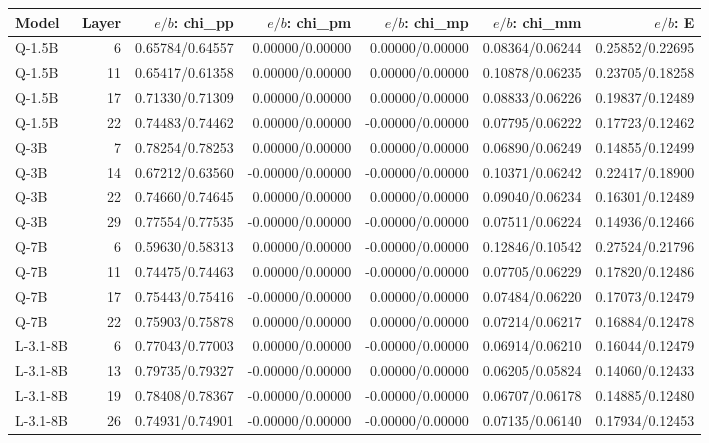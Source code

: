 \begin{tabular}{lrrrrrr}
\toprule
Model & Layer & $e/b$: chi\_pp & $e/b$: chi\_pm & $e/b$: chi\_mp & $e/b$: chi\_mm & $e/b$: E \\
\midrule
Q-1.5B & 6 & 0.65784/0.64557 & 0.00000/0.00000 & 0.00000/0.00000 & 0.08364/0.06244 & 0.25852/0.22695 \\
Q-1.5B & 11 & 0.65417/0.61358 & 0.00000/0.00000 & 0.00000/0.00000 & 0.10878/0.06235 & 0.23705/0.18258 \\
Q-1.5B & 17 & 0.71330/0.71309 & 0.00000/0.00000 & 0.00000/0.00000 & 0.08833/0.06226 & 0.19837/0.12489 \\
Q-1.5B & 22 & 0.74483/0.74462 & 0.00000/0.00000 & -0.00000/0.00000 & 0.07795/0.06222 & 0.17723/0.12462 \\
Q-3B & 7 & 0.78254/0.78253 & 0.00000/0.00000 & 0.00000/0.00000 & 0.06890/0.06249 & 0.14855/0.12499 \\
Q-3B & 14 & 0.67212/0.63560 & -0.00000/0.00000 & -0.00000/0.00000 & 0.10371/0.06242 & 0.22417/0.18900 \\
Q-3B & 22 & 0.74660/0.74645 & 0.00000/0.00000 & 0.00000/0.00000 & 0.09040/0.06234 & 0.16301/0.12489 \\
Q-3B & 29 & 0.77554/0.77535 & -0.00000/0.00000 & -0.00000/0.00000 & 0.07511/0.06224 & 0.14936/0.12466 \\
Q-7B & 6 & 0.59630/0.58313 & 0.00000/0.00000 & -0.00000/0.00000 & 0.12846/0.10542 & 0.27524/0.21796 \\
Q-7B & 11 & 0.74475/0.74463 & 0.00000/0.00000 & -0.00000/0.00000 & 0.07705/0.06229 & 0.17820/0.12486 \\
Q-7B & 17 & 0.75443/0.75416 & -0.00000/0.00000 & 0.00000/0.00000 & 0.07484/0.06220 & 0.17073/0.12479 \\
Q-7B & 22 & 0.75903/0.75878 & 0.00000/0.00000 & 0.00000/0.00000 & 0.07214/0.06217 & 0.16884/0.12478 \\
L-3.1-8B & 6 & 0.77043/0.77003 & 0.00000/0.00000 & -0.00000/0.00000 & 0.06914/0.06210 & 0.16044/0.12479 \\
L-3.1-8B & 13 & 0.79735/0.79327 & -0.00000/0.00000 & 0.00000/0.00000 & 0.06205/0.05824 & 0.14060/0.12433 \\
L-3.1-8B & 19 & 0.78408/0.78367 & -0.00000/0.00000 & -0.00000/0.00000 & 0.06707/0.06178 & 0.14885/0.12480 \\
L-3.1-8B & 26 & 0.74931/0.74901 & -0.00000/0.00000 & -0.00000/0.00000 & 0.07135/0.06140 & 0.17934/0.12453 \\

\end{tabular}
